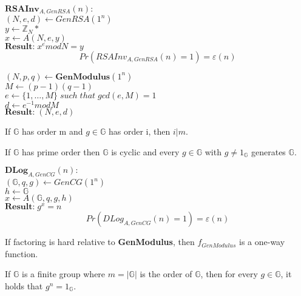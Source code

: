 \documentclass[../main]{subfiles}
\begin{document}
\noindent
$\textbf{RSAInv}_{A, GenRSA}(n):$\\
$(N, e, d) \leftarrow{} GenRSA(1^n)$\\
$y \leftarrow{} \mathbb{Z}_N*$\\
$x \leftarrow{} A(N, e, y)$\\
$\textbf{Result:} \; x^e mod N = y$
$$Pr(RSAInv_{A, GenRSA}(n) = 1) = \varepsilon{} (n)$$

\noindent
$(N, p, q) \leftarrow{} \textbf{GenModulus}(1^n)$\\
$M \leftarrow{} (p-1)(q-1)$\\
$e \leftarrow{} \{1, \ldots, M\} \; such \; that \; gcd(e, M) = 1$\\
$d \leftarrow{} e^{-1} mod M$\\
$\textbf{Result:} \; (N, e, d)$

\begin{lemma}
	If $\mathbb{G}$ has order m and $g \in{} \mathbb{G}$ has order i, then $i|m$.
\end{lemma}

\begin{theorem}
	If $\mathbb{G}$ has prime order then $\mathbb{G}$ is cyclic and every $g \in{} \mathbb{G}$ with $g \neq{} 1_{\mathbb{G}}$ generates $\mathbb{G}.$
\end{theorem}

\noindent
$\textbf{DLog}_{A, GenCG} (n):$\\
$(\mathbb{G}, q, g) \leftarrow{} GenCG(1^n)$\\
$h \leftarrow{} \mathbb{G}$\\
$x \leftarrow{} A(\mathbb{G}, q, g, h)$\\
$\textbf{Result:} \; g^x  =    n $
$$Pr(DLog_{A, GenCG} (n) = 1) = \varepsilon{} (n)$$


\begin{theorem}
	If factoring is hard relative to \textbf{GenModulus}, then $f_{GenModulus}$ is a one-way function.
\end{theorem}

\begin{theorem}
	If $\mathbb{G}$ is a finite group where $m = |\mathbb{G}|$ is the order of $\mathbb{G}$, then for every $g \in{} \mathbb{G}$, it holds that $g^n = 1_{\mathbb{G}}$.
\end{theorem}
\end{document}
